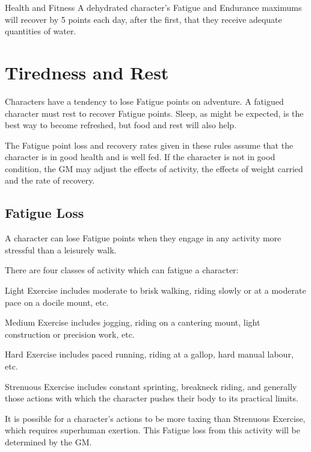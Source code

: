 \begin{Chapter}{Health and Fitness}
A dehydrated character’s Fatigue and Endurance maximums will recover
by 5 points each day, after the first, that they receive adequate
quantities of water.


\section{Tiredness and Rest}

Characters have a tendency to lose Fatigue points on adventure.  A
fatigued character must rest to recover Fatigue points.  Sleep, as
might be expected, is the best way to become refreshed, but food and
rest will also help.

The Fatigue point loss and recovery rates given in these rules assume
that the character is in good health and is well fed.  If the
character is not in good condition, the GM may adjust the effects of
activity, the effects of weight carried and the rate of recovery.

\subsection{Fatigue Loss}

A character can lose Fatigue points when they engage in any activity
more stressful than a leisurely walk.

There are four classes of activity which can fatigue a character:

\begin{Enumerate}

\item Light Exercise includes moderate to brisk walking, riding slowly
  or at a moderate pace on a docile mount, etc.

\item Medium Exercise includes jogging, riding on a cantering mount,
  light construction or precision work, etc.

\item Hard Exercise includes paced running, riding at a gallop, hard
  manual labour, etc.

\item Strenuous Exercise includes constant sprinting, breakneck
  riding, and generally those actions with which the character pushes
  their body to its practical limits.

\end{Enumerate}

It is possible for a character’s actions to be more taxing than
Strenuous Exercise, which requires superhuman exertion.  This Fatigue
loss from this activity will be determined by the GM.


\end{Chapter}
